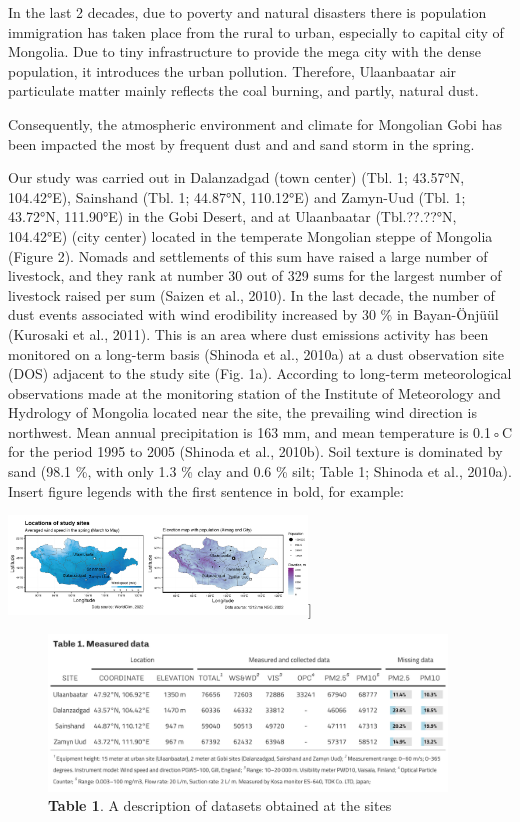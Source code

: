 \documentclass[
  11pt,
]{article}
\begin{document}
In the last 2 decades, due to poverty and natural disasters there is
population immigration has taken place from the rural to urban,
especially to capital city of Mongolia. Due to tiny infrastructure to
provide the mega city with the dense population, it introduces the urban
pollution. Therefore, Ulaanbaatar air particulate matter mainly reflects
the coal burning, and partly, natural dust.

Consequently, the atmospheric environment and climate for Mongolian Gobi
has been impacted the most by frequent dust and and sand storm in the
spring.

Our study was carried out in Dalanzadgad (town center) (Tbl. 1; 43.57°N,
104.42°E), Sainshand (Tbl. 1; 44.87°N, 110.12°E) and Zamyn-Uud (Tbl. 1;
43.72°N, 111.90°E) in the Gobi Desert, and at Ulaanbaatar (Tbl.??.??°N,
104.42°E) (city center) located in the temperate Mongolian steppe of
Mongolia (Figure 2). Nomads and settlements of this sum have raised a
large number of livestock, and they rank at number 30 out of 329 sums
for the largest number of livestock raised per sum (Saizen et al.,
2010). In the last decade, the number of dust events associated with
wind erodibility increased by 30 \% in Bayan-Önjüül (Kurosaki et al.,
2011). This is an area where dust emissions activity has been monitored
on a long-term basis (Shinoda et al., 2010a) at a dust observation site
(DOS) adjacent to the study site (Fig. 1a). According to long-term
meteorological observations made at the monitoring station of the
Institute of Meteorology and Hydrology of Mongolia located near the
site, the prevailing wind direction is northwest. Mean annual
precipitation is 163 mm, and mean temperature is 0.1◦C for the period
1995 to 2005 (Shinoda et al., 2010b). Soil texture is dominated by sand
(98.1 \%, with only 1.3 \% clay and 0.6 \% silt; Table 1; Shinoda et
al., 2010a). Insert figure legends with the first sentence in bold, for
example:

\newpage

\includegraphics[width=3.125in,height=\textheight]{images/figure_1.png}{]}

\begin{figure}
\centering
\includegraphics[width=4.16667in,height=\textheight]{images/table_1.png}
\caption{\textbf{Table 1}. A description of datasets obtained at the
sites}
\end{figure}
\end{document}
